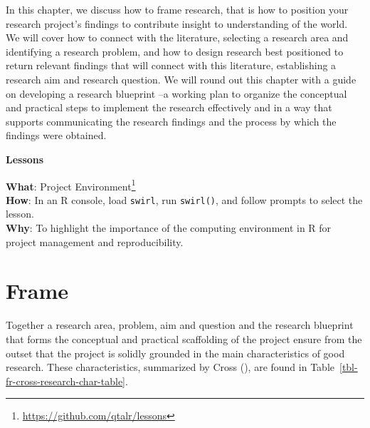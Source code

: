 \documentclass[
  letterpaper,
]{latex/krantz}
\theoremstyle{definition}
\theoremstyle{remark}
\DeclareRobustCommand{\href}[2]{#2\footnote{\url{#1}}}
\begin{document}
In this chapter, we discuss how to frame research, that is how to
position your research project's findings to contribute insight to
understanding of the world. We will cover how to connect with the
literature, selecting a research area and identifying a research
problem, and how to design research best positioned to return relevant
findings that will connect with this literature, establishing a research
aim and research question. We will round out this chapter with a guide
on developing a research blueprint --a working plan to organize the
conceptual and practical steps to implement the research effectively and
in a way that supports communicating the research findings and the
process by which the findings were obtained.

\begin{tcolorbox}[enhanced jigsaw, toprule=.15mm, breakable, colback=white, opacityback=0, leftrule=.75mm, bottomrule=.15mm, colframe=quarto-callout-color-frame, left=2mm, arc=.35mm, rightrule=.15mm]

\textbf{ Lessons}

\textbf{What}: \href{https://github.com/qtalr/lessons}{Project
Environment}\\
\textbf{How}: In an R console, load \texttt{swirl}, run
\texttt{swirl()}, and follow prompts to select the lesson.\\
\textbf{Why}: To highlight the importance of the computing environment
in R for project management and reproducibility.

\end{tcolorbox}

\section{Frame}\label{sec-fr-frame}

Together a research area, problem, aim and question and the research
blueprint that forms the conceptual and practical scaffolding of the
project ensure from the outset that the project is solidly grounded in
the main characteristics of good research. These characteristics,
summarized by Cross (), are found in
Table~\ref{tbl-fr-cross-research-char-table}.
\end{document}

